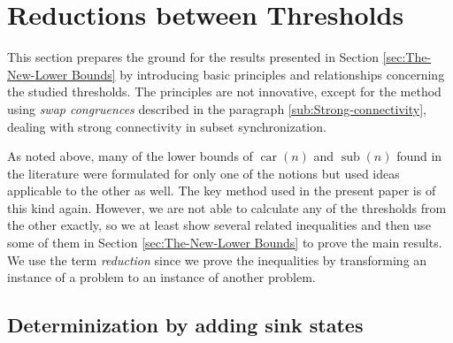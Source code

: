 \documentclass{ws-ijmpc}
\DeclareMathOperator{\car}{car}
\DeclareMathOperator{\sub}{sub}
\begin{document}
\section{Reductions between Thresholds\label{sec:Reductions-between-Thresholds}}

This section prepares the ground for the results presented in Section
\ref{sec:The-New-Lower Bounds} by introducing basic principles and
relationships concerning the studied thresholds. The principles are
not innovative, except for the method using \emph{swap congruences
}described in the paragraph \ref{sub:Strong-connectivity}, dealing
with strong connectivity in subset synchronization.

As noted above, many of the lower bounds of $\car\!\left(n\right)$
and $\sub\!\left(n\right)$ found in the literature were formulated
for only one of the notions but used ideas applicable to the other
as well. The key method used in the present paper is of this kind
again. However, we are not able to calculate any of the thresholds
from the other exactly, so we at least show several related inequalities
and then use some of them in Section \ref{sec:The-New-Lower Bounds}
to prove the main results. We use the term \emph{reduction} since
we prove the inequalities by transforming an instance of a problem
to an instance of another problem.


\subsection{Determinization by adding sink states }
\end{document}

